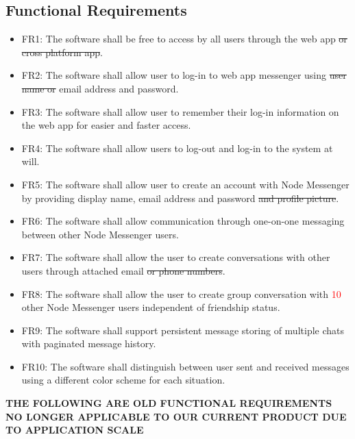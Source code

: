 \documentclass[12pt, titlepage]{article}
\begin{document}
    	\subsection{Functional Requirements}
	    \begin{itemize}
		    \item FR1: The software shall be free to access by all users through the web app \sout{or cross platform app}.
		    \item FR2: The software shall allow user to log-in to web app messenger using \sout{user name or} email address and password.
		    \item FR3: The software shall allow user to remember their log-in information on the web app for easier and faster access.
		    \item FR4: The software shall allow users to log-out and log-in to the system at will.
		    \item FR5: The software shall allow user to create an account with Node Messenger by providing display name, email address and password \sout{and profile picture}.
		    \item FR6: The software shall allow communication through one-on-one messaging between other Node Messenger users.
		    \item FR7: The software shall allow the user to create conversations with other users through attached email \sout{ or phone numbers}.
		    \item FR8: The software shall allow the user to create group conversation with \textcolor{red}{10} other Node Messenger users independent of friendship status.
		    \item FR9: The software shall support persistent message storing of multiple chats with paginated message history.
		    \item FR10: The software shall distinguish between user sent and received messages using a different color scheme for each situation.
		    
	\end{itemize}
	
\textbf{THE FOLLOWING ARE OLD FUNCTIONAL REQUIREMENTS NO LONGER APPLICABLE TO OUR CURRENT PRODUCT DUE TO APPLICATION SCALE}\\
		
\end{document}
